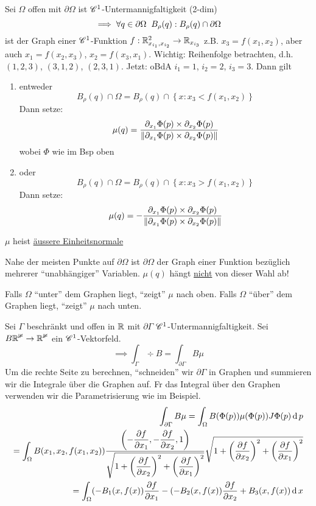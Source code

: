 \begin{Def}
  Sei $\Omega$ offen mit $\partial\Omega$ ist $\mathscr{C}^1$-Untermannigfaltigkeit (2-dim) 
  \[\implies \forall q\in \partial\Omega\hspace{2mm} B_\rho(q): B_\rho(q)\cap \partial\Omega\]
  ist der Graph einer $\mathscr{C}^1$-Funktion $f:\mathbb{R}^2_{x_{i_1}, x_{i_2}}\rightarrow\mathbb{R}_{x_{i_3}}$
  z.B. $x_3=f(x_1,x_2)$, aber auch $x_1=f(x_2,x_3)$, $x_2=f(x_3,x_1)$.
  Wichtig: Reihenfolge betrachten, d.h. $(1,2,3)$, $(3,1,2)$, $(2,3,1)$.
  Jetzt: oBdA $i_1=1$, $i_2=2$, $i_3=3$. Dann gilt
  \begin{enumerate}
    \item entweder
      \[B_\rho(q)\cap\Omega=B_\rho(q)\cap\left\{ x:x_3<f(x_1,x_2) \right\} \]
      Dann setze:
      \[\mu(q)=\frac{\partial_{x_1}\Phi(p) \times \partial_{x_2}\Phi(p)}{\left\| \partial_{x_1}\Phi(p) \times \partial_{x_2}\Phi(p) \right\|}\]
      wobei $\Phi$ wie im Bsp oben
    \item oder 
      \[B_\rho(q)\cap\Omega=B_\rho(q)\cap\left\{ x:x_3>f(x_1,x_2) \right\} \]
      Dann setze:
      \[\mu(q)=-\frac{\partial_{x_1}\Phi(p) \times \partial_{x_2}\Phi(p)}{\left\| \partial_{x_1}\Phi(p) \times \partial_{x_2}\Phi(p) \right\|}\]
  \end{enumerate}
  $\mu$ heist \ul{äussere Einheitsnormale}
\end{Def}
\begin{Bem}
  Nahe der meisten Punkte auf $\partial\Omega$ ist $\partial\Omega$ der Graph einer Funktion bezüglich mehrerer ``unabhängiger'' Variablen. $\mu(q)$ hängt \ul{nicht} von dieser Wahl ab!
\end{Bem}
\begin{Bem}
  Falls $\Omega$ ``unter'' dem Graphen liegt, ``zeigt'' $\mu$ nach oben. Falls $\Omega$ ``über'' dem Graphen liegt, ``zeigt'' $\mu$ nach unten.
\end{Bem}
\begin{Sat}
  Sei $\Gamma$ beschränkt und offen in $\mathbb{R}$ mit $\partial\Gamma$ $\mathscr{C}^1$-Untermannigfaltigkeit. Sei $B\mathbb{R^3}\rightarrow\mathbb{R^3}$ ein $\mathscr{C}^1$-Vektorfeld.
  \begin{equation}
    \label{e:1105301}
    \implies \int_\Gamma\div B=\int_{\partial\Gamma}B\mu
  \end{equation}
  Um die rechte Seite zu berechnen, ``schneiden'' wir $\partial\Gamma$ in Graphen und summieren wir die Integrale über die Graphen auf. Fr das Integral über den Graphen verwenden wir die Parametrisierung wie im Beispiel. %
  \begin{eqnarray*}
    \int_{\partial\Gamma}B\mu = \int_\Omega B(\Phi(p))\mu(\Phi(p))J\Phi(p)\operatorname{d} p\\
    =\int_\Omega B(x_1,x_2,f(x_1,x_2))\frac{\left( -\dfrac{\partial f}{\partial x_1},-\dfrac{\partial f}{\partial x_2},1 \right)}{\sqrt{1+\left( \dfrac{\partial f}{\partial x_2} \right)^2+\left( \dfrac{\partial f}{\partial x_1} \right)^2}}\sqrt{1+\left( \dfrac{\partial f}{\partial x_2} \right)^2+\left( \dfrac{\partial f}{\partial x_1} \right)^2}\\
    =\int_\Omega (-B_1(x,f(x))\dfrac{\partial f}{\partial x_1}-(-B_2(x,f(x))\dfrac{\partial f}{\partial x_2}+B_3(x,f(x))\operatorname{d} x
  \end{eqnarray*}
\end{Sat}
